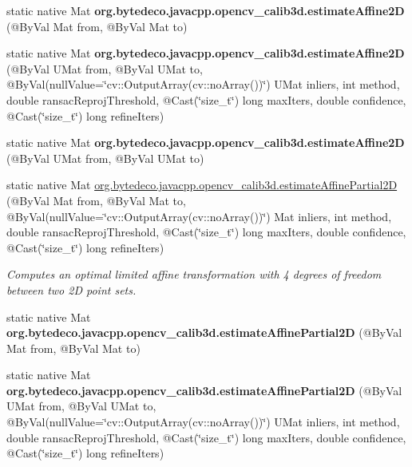 \begin{DoxyCompactItemize}
\mbox{\label{group__calib3d_gaf8f606801c91737cdd734c213fe97a85}} 
static native Mat {\bfseries org.\+bytedeco.\+javacpp.\+opencv\+\_\+calib3d.\+estimate\+Affine2D} (@By\+Val Mat from, @By\+Val Mat to)
\item 
\mbox{\label{group__calib3d_gaee1e19cde4924fe15174991e23f50191}} 
static native Mat {\bfseries org.\+bytedeco.\+javacpp.\+opencv\+\_\+calib3d.\+estimate\+Affine2D} (@By\+Val U\+Mat from, @By\+Val U\+Mat to, @By\+Val(null\+Value=\char`\"{}cv\+::\+Output\+Array(cv\+::no\+Array())\char`\"{}) U\+Mat inliers, int method, double ransac\+Reproj\+Threshold, @Cast(\char`\"{}size\+\_\+t\char`\"{}) long max\+Iters, double confidence, @Cast(\char`\"{}size\+\_\+t\char`\"{}) long refine\+Iters)
\item 
\mbox{\label{group__calib3d_ga430cc49d1272d6192e912f57b7d9e023}} 
static native Mat {\bfseries org.\+bytedeco.\+javacpp.\+opencv\+\_\+calib3d.\+estimate\+Affine2D} (@By\+Val U\+Mat from, @By\+Val U\+Mat to)
\item 
static native Mat \hyperlink{group__calib3d_gab4e1d79cab0ae6448de411f9688836c8}{org.\+bytedeco.\+javacpp.\+opencv\+\_\+calib3d.\+estimate\+Affine\+Partial2D} (@By\+Val Mat from, @By\+Val Mat to, @By\+Val(null\+Value=\char`\"{}cv\+::\+Output\+Array(cv\+::no\+Array())\char`\"{}) Mat inliers, int method, double ransac\+Reproj\+Threshold, @Cast(\char`\"{}size\+\_\+t\char`\"{}) long max\+Iters, double confidence, @Cast(\char`\"{}size\+\_\+t\char`\"{}) long refine\+Iters)
\begin{DoxyCompactList}\small\item\em Computes an optimal limited affine transformation with 4 degrees of freedom between two 2D point sets. \end{DoxyCompactList}\item 
\mbox{\label{group__calib3d_gae0dc6fb9e85a298b978370b30f7d39df}} 
static native Mat {\bfseries org.\+bytedeco.\+javacpp.\+opencv\+\_\+calib3d.\+estimate\+Affine\+Partial2D} (@By\+Val Mat from, @By\+Val Mat to)
\item 
\mbox{\label{group__calib3d_ga4ad48b38e7fa18df7d244478c6a6f204}} 
static native Mat {\bfseries org.\+bytedeco.\+javacpp.\+opencv\+\_\+calib3d.\+estimate\+Affine\+Partial2D} (@By\+Val U\+Mat from, @By\+Val U\+Mat to, @By\+Val(null\+Value=\char`\"{}cv\+::\+Output\+Array(cv\+::no\+Array())\char`\"{}) U\+Mat inliers, int method, double ransac\+Reproj\+Threshold, @Cast(\char`\"{}size\+\_\+t\char`\"{}) long max\+Iters, double confidence, @Cast(\char`\"{}size\+\_\+t\char`\"{}) long refine\+Iters)

\end{DoxyCompactItemize}
